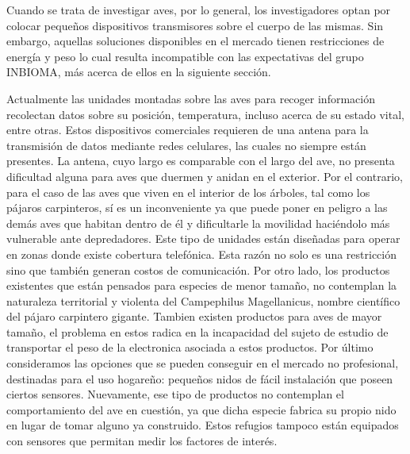 %

%


Cuando se trata de investigar aves, por lo general, los investigadores optan por colocar pequeños dispositivos transmisores sobre el cuerpo de las mismas. Sin embargo, aquellas soluciones disponibles en el mercado tienen restricciones de energía y peso lo cual resulta incompatible con las expectativas del grupo INBIOMA, más acerca de ellos en la siguiente sección.

Actualmente las unidades montadas sobre las aves para recoger información recolectan datos sobre su posición, temperatura, incluso acerca de su estado vital, entre otras. Estos dispositivos comerciales requieren de una antena para la transmisión de datos mediante redes celulares, las cuales no siempre están presentes. La antena, cuyo largo es comparable con el largo del ave, no presenta dificultad alguna para aves que duermen y anidan en el exterior. Por el contrario, para el caso de las aves que viven en el interior de los árboles, tal como los pájaros carpinteros, sí es un inconveniente ya que puede poner en peligro a las demás aves que habitan dentro de él y dificultarle la movilidad haciéndolo más vulnerable ante depredadores. 
Este tipo de unidades están diseñadas para operar en zonas donde existe cobertura telefónica. Esta razón no solo es una restricción sino que también generan costos de comunicación. Por otro lado, los productos existentes que están pensados para especies de menor tamaño, no contemplan la naturaleza territorial y violenta del Campephilus Magellanicus, nombre científico del pájaro carpintero gigante.
Tambien existen productos para aves de mayor tamaño, el problema en estos radica en la incapacidad del sujeto de estudio de transportar el peso de la electronica asociada a estos productos.
Por último consideramos las opciones que se pueden conseguir en el mercado no profesional, destinadas para el uso hogareño: pequeños nidos de fácil instalación que poseen ciertos sensores. Nuevamente, ese tipo de productos no contemplan el comportamiento del ave en cuestión, ya que dicha especie fabrica su propio nido en lugar de tomar alguno ya construido. Estos refugios tampoco están equipados con sensores que permitan medir los factores de interés. 


